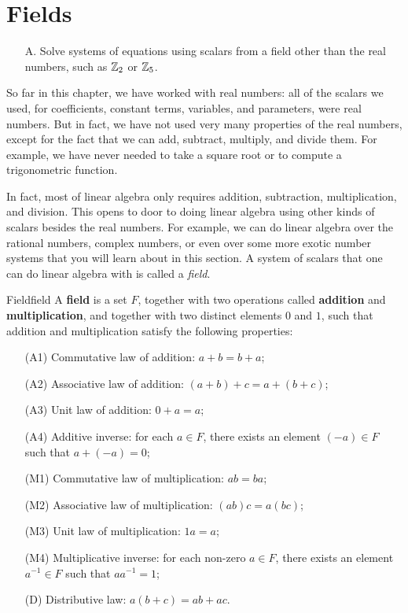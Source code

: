 \section{Fields}
\label{sec:fields}

\begin{outcome}
  \begin{enumerate}
  \item[A.] Solve systems of equations using scalars from a field
    other than the real numbers, such as $\mathbb{Z}_2$ or
    $\mathbb{Z}_5$.
  \end{enumerate}
\end{outcome}

So far in this chapter, we have worked with real numbers: all of the
scalars we used, for coefficients, constant terms, variables, and
parameters, were real numbers. But in fact, we have not used very many
properties of the real numbers, except for the fact that we can add,
subtract, multiply, and divide them. For example, we have never needed
to take a square root or to compute a trigonometric function.

In fact, most of linear algebra only requires addition, subtraction,
multiplication, and division. This opens to door to doing linear
algebra using other kinds of scalars besides the real numbers. For
example, we can do linear algebra over the rational numbers, complex
numbers, or even over some more exotic number systems that you will
learn about in this section. A system of scalars that one can do
linear algebra with is called a {\em field}.

\begin{definition}{Field}{field}
  A \textbf{field} is a set $F$, together with two
  operations called \textbf{addition} and
  \textbf{multiplication}, and together
  with two distinct elements $0$ and $1$, such that addition and
  multiplication satisfy the following properties:
  \begin{itemize}
  \item[(A1)] {Commutative law of addition:} $a+b=b+a$;
  \item[(A2)] {Associative law of addition:} $(a+b)+c = a+(b+c)$;
  \item[(A3)] {Unit law of addition:} $0+a = a$;
  \item[(A4)] {Additive inverse:} for each $a\in F$, there exists an element $(-a)\in F$ such that $a+(-a)=0$;
  \item[(M1)] {Commutative law of multiplication:} $ab=ba$;
  \item[(M2)] {Associative law of multiplication:} $(ab)c=a(bc)$;
  \item[(M3)] {Unit law of multiplication:} $1a=a$;
  \item[(M4)] {Multiplicative inverse:} for each non-zero $a\in F$, there exists an element $a^{-1}\in F$ such that $aa^{-1}=1$;
  \item[(D)] {Distributive law:} $a(b+c)=ab+ac$.
  \end{itemize}
\end{definition}

